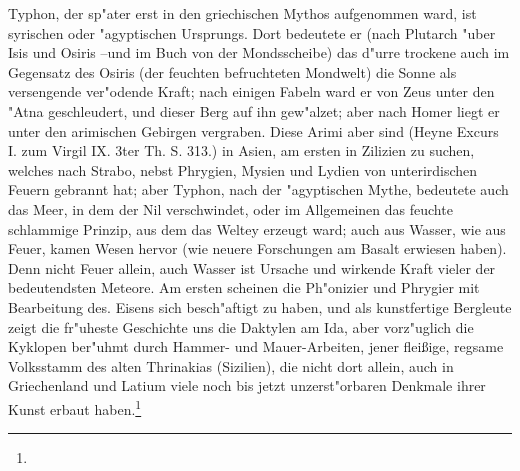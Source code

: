 \documentclass[a4paper, 11pt, oneside, polutonikogreek, german]{article}
\begin{document}
Typhon, der sp"ater erst in den griechischen Mythos aufgenommen ward, ist syrischen oder "agyptischen Ursprungs. Dort bedeutete er (nach Plutarch "uber Isis und Osiris --und im Buch von der Mondsscheibe) das d"urre trockene auch im Gegensatz des Osiris (der feuchten befruchteten Mondwelt) die Sonne als versengende ver"odende Kraft; nach einigen Fabeln ward er von Zeus unter den "Atna geschleudert, und dieser Berg auf ihn gew"alzet; aber nach Homer liegt er unter den arimischen Gebirgen vergraben. Diese Arimi aber sind (Heyne Excurs I. zum Virgil IX. 3ter Th. S. 313.) in Asien, am ersten in Zilizien zu suchen, welches nach Strabo, nebst Phrygien, Mysien und Lydien von unterirdischen Feuern gebrannt hat; aber Typhon, nach der "agyptischen Mythe, bedeutete auch das Meer, in dem der Nil verschwindet, oder im Allgemeinen das feuchte schlammige Prinzip, aus dem das Weltey erzeugt ward; auch aus Wasser, wie aus Feuer, kamen Wesen hervor (wie neuere Forschungen am Basalt erwiesen haben). Denn nicht Feuer allein, auch Wasser ist Ursache und wirkende Kraft vieler der bedeutendsten Meteore. Am ersten scheinen die Ph"onizier und Phrygier mit Bearbeitung des. Eisens sich besch"aftigt zu haben, und als kunstfertige Bergleute zeigt die fr"uheste Geschichte uns die Daktylen am Ida, aber vorz"uglich die Kyklopen ber"uhmt durch Hammer- und Mauer-Arbeiten, jener fleißige, regsame Volksstamm des alten Thrinakias (Sizilien), die nicht dort allein, auch in Griechenland und Latium viele noch bis jetzt unzerst"orbaren Denkmale ihrer Kunst erbaut haben.\footnote{}
\end{document}
